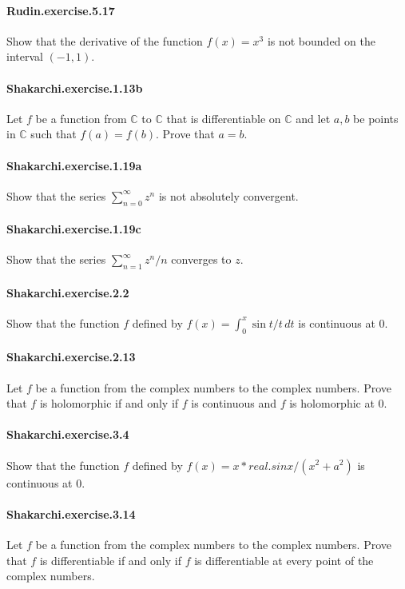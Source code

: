 \documentclass{article}
\begin{document}
\paragraph{Rudin.exercise.5.17} Show that the derivative of the function $f(x)=x^3$ is not bounded on the interval $(-1,1)$.

\paragraph{Shakarchi.exercise.1.13b} Let $f$ be a function from $\mathbb{C}$ to $\mathbb{C}$ that is differentiable on $\mathbb{C}$ and let $a, b$ be points in $\mathbb{C}$ such that $f(a) = f(b)$. Prove that $a = b$.

\paragraph{Shakarchi.exercise.1.19a} Show that the series
  $\sum_{n=0}^\infty z^n$ is not absolutely convergent.

\paragraph{Shakarchi.exercise.1.19c} Show that the series
  $\sum_{n=1}^\infty z^n/n$ converges to $z$.

\paragraph{Shakarchi.exercise.2.2} Show that the function $f$ defined by $f(x) = \int_0^x \sin t / t \, dt$ is continuous at $0$.

\paragraph{Shakarchi.exercise.2.13} Let $f$ be a function from the complex numbers to the complex numbers. Prove that $f$ is holomorphic if and only if $f$ is continuous and $f$ is holomorphic at $0$.

\paragraph{Shakarchi.exercise.3.4} Show that the function $f$ defined by $f(x) = x * real.sin x / (x ^ 2 + a ^ 2)$ is continuous at $0$.

\paragraph{Shakarchi.exercise.3.14} Let $f$ be a function from the complex numbers to the complex numbers. Prove that $f$ is differentiable if and only if $f$ is differentiable at every point of the complex numbers.

\end{document}
